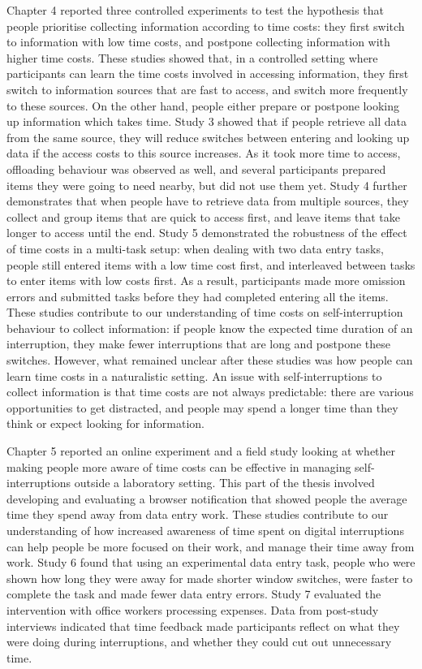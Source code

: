 Chapter 4 reported three controlled experiments to test the hypothesis that people prioritise collecting information according to time costs: they first switch to information with low time costs, and postpone collecting information with higher time costs. These studies showed that, in a controlled setting where participants can learn the time costs involved in accessing information, they first switch to information sources that are fast to access, and switch more frequently to these sources. On the other hand, people either prepare or postpone looking up information which takes time. Study 3 showed that if people retrieve all data from the same source, they will reduce switches between entering and looking up data if the access costs to this source increases. As it took more time to access, offloading behaviour was observed as well, and several participants prepared items they were going to need nearby, but did not use them yet. Study 4 further demonstrates that when people have to retrieve data from multiple sources, they collect and group items that are quick to access first, and leave items that take longer to access until the end. Study 5 demonstrated the robustness of the effect of time costs in a multi-task setup: when dealing with two data entry tasks, people still entered items with a low time cost first, and interleaved between tasks to enter items with low costs first. As a result, participants made more omission errors and submitted tasks before they had completed entering all the items. These studies contribute to our understanding of time costs on self-interruption behaviour to collect information: if people know the expected time duration of an interruption, they make fewer interruptions that are long and postpone these switches. However, what remained unclear after these studies was how people can learn time costs in a naturalistic setting. An issue with self-interruptions to collect information is that time costs are not always predictable: there are various opportunities to get distracted, and people may spend a longer time than they think or expect looking for information.

Chapter 5 reported an online experiment and a field study looking at whether making people more aware of time costs can be effective in managing self-interruptions outside a laboratory setting. This part of the thesis involved developing and evaluating  a browser notification that showed people the average time they spend away from data entry work. These studies contribute to our understanding of how increased awareness of time spent on digital interruptions can help people be more focused on their work, and manage their time away from work. Study 6 found that using an experimental data entry task, people who were shown how long they were away for made shorter window switches, were faster to complete the task and made fewer data entry errors. Study 7 evaluated the intervention with office workers processing expenses. Data from post-study interviews indicated that time feedback made participants reflect on what they were doing during interruptions, and whether they could cut out unnecessary time. 


